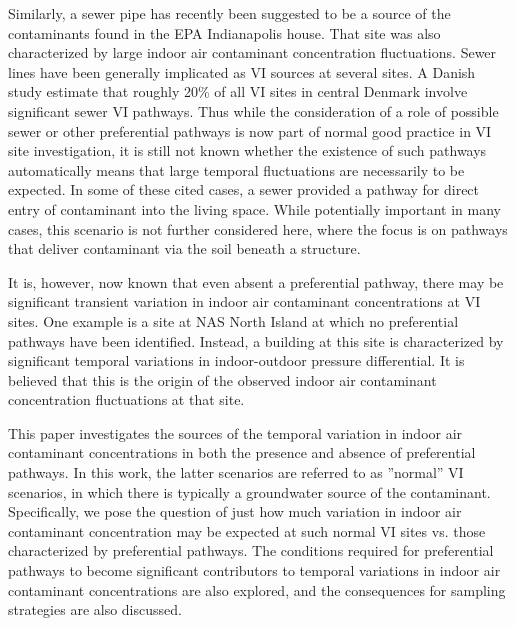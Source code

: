 \documentclass[journal=esthag,manuscript=article]{achemso}
\begin{document}
Similarly, a sewer pipe has recently been suggested to be a source of the contaminants found in the EPA Indianapolis house.
That site was also characterized by large indoor air contaminant concentration fluctuations\cite{mchugh_evidence_2017,u.s._environmental_protection_agency_assessment_2015}.
Sewer lines have been generally implicated as VI sources at several sites\cite{pennell_sewer_2013,mchugh_evidence_2017,roghani_occurrence_2018,riis_vapor_2010}.
A Danish study estimate that roughly 20\% of all VI sites in central Denmark involve significant sewer VI pathways\cite{nielsen_remediation_2017}.
Thus while the consideration of a role of possible sewer or other preferential pathways is now part of normal good practice in VI site investigation\cite{u.s._environmental_protection_agency_oswer_2015}, it is still not known whether the existence of such pathways automatically means that large temporal fluctuations are necessarily to be expected.
In some of these cited cases\cite{pennell_sewer_2013,riis_vapor_2010}, a sewer provided a pathway for direct entry of contaminant into the living space.
While potentially important in many cases, this scenario is not further considered here, where the focus is on pathways that deliver contaminant via the soil beneath a structure. \par

It is, however, now known that even absent a preferential pathway, there may be significant transient variation in indoor air contaminant concentrations at VI sites\cite{folkes_observed_2009,brenner_results_2010,johnston_spatiotemporal_2014}.
One example is a site at NAS North Island at which no preferential pathways have been identified.
Instead, a building at this site is characterized by significant temporal variations in indoor-outdoor pressure differential\cite{hosangadi_high-frequency_2017}.
It is believed that this is the origin of the observed indoor air contaminant concentration fluctuations at that site. \par

This paper investigates the sources of the temporal variation in indoor air contaminant concentrations in both the presence and absence of preferential pathways.
In this work, the latter scenarios are referred to as ”normal” VI scenarios, in which there is typically a groundwater source of the contaminant.
Specifically, we pose the question of just how much variation in indoor air contaminant concentration may be expected at  such normal  VI  sites vs. those characterized by preferential pathways.
The conditions required for preferential pathways to become significant contributors to temporal variations in indoor air contaminant concentrations are also explored, and the consequences for sampling strategies are also discussed.
\end{document}
